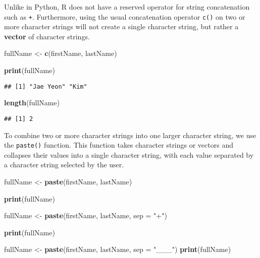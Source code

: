 \documentclass[
]{book}
\newenvironment{Shaded}{\begin{snugshade}}{\end{snugshade}}
\newcommand{\DataTypeTok}[1]{\textcolor[rgb]{0.13,0.29,0.53}{#1}}
\newcommand{\KeywordTok}[1]{\textcolor[rgb]{0.13,0.29,0.53}{\textbf{#1}}}
\newcommand{\NormalTok}[1]{#1}
\newcommand{\StringTok}[1]{\textcolor[rgb]{0.31,0.60,0.02}{#1}}
\begin{document}
Unlike in Python, R does not have a reserved operator for string concatenation such as \texttt{+}. Furthermore, using the usual concatenation operator \texttt{c()} on two or more character strings will not create a single character string, but rather a \textbf{vector} of character strings.

\begin{Shaded}
\begin{Highlighting}[]
\NormalTok{fullName \textless{}{-}}\StringTok{ }\KeywordTok{c}\NormalTok{(firstName, lastName)}

\KeywordTok{print}\NormalTok{(fullName)}
\end{Highlighting}
\end{Shaded}

\begin{verbatim}
## [1] "Jae Yeon" "Kim"
\end{verbatim}

\begin{Shaded}
\begin{Highlighting}[]
\KeywordTok{length}\NormalTok{(fullName)}
\end{Highlighting}
\end{Shaded}

\begin{verbatim}
## [1] 2
\end{verbatim}

To combine two or more character strings into one larger character string, we use the \texttt{paste()} function. This function takes character strings or vectors and collapses their values into a single character string, with each value separated by a character string selected by the user.

\begin{Shaded}
\begin{Highlighting}[]
\NormalTok{fullName \textless{}{-}}\StringTok{ }\KeywordTok{paste}\NormalTok{(firstName, lastName)}

\KeywordTok{print}\NormalTok{(fullName)}

\NormalTok{fullName \textless{}{-}}\StringTok{ }\KeywordTok{paste}\NormalTok{(firstName, lastName, }\DataTypeTok{sep =} \StringTok{"+"}\NormalTok{)}

\KeywordTok{print}\NormalTok{(fullName)}

\NormalTok{fullName \textless{}{-}}\StringTok{ }\KeywordTok{paste}\NormalTok{(firstName, lastName, }\DataTypeTok{sep =} \StringTok{"\_\_\_"}\NormalTok{)}
\KeywordTok{print}\NormalTok{(fullName)}
\end{Highlighting}
\end{Shaded}
\end{document}
